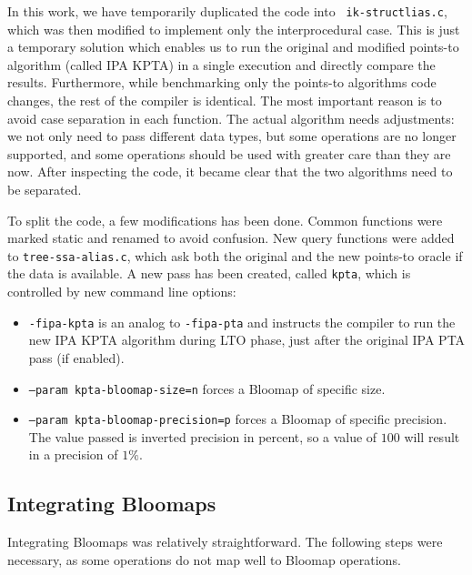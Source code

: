 In this work, we have temporarily duplicated the code into {\tt
ik-structlias.c}, which was then modified to implement only the interprocedural
case. This is just a temporary solution which enables us to run the original
and modified points-to algorithm (called IPA KPTA) in a single execution and directly compare the
results. Furthermore, while benchmarking only the points-to algorithms code
changes, the rest of the compiler is identical.  The most important reason is
to avoid case separation in each function. The actual algorithm needs
adjustments: we not only need to pass different data types, but some operations
are no longer supported, and some operations should be used with greater care
than they are now. After inspecting the code, it became clear that the two
algorithms need to be separated.

To split the code, a few modifications has been done. Common functions were
marked static and renamed to avoid confusion. New query functions were added to
{\tt tree-ssa-alias.c}, which ask both the original and the new points-to oracle
if the data is available. A new pass has been created, called {\tt kpta}, which
is controlled by new command line options:

\begin{itemize}
	\item {\tt -fipa-kpta} is an analog to {\tt -fipa-pta} and instructs the compiler to run the new IPA KPTA algorithm during LTO phase, just after the original IPA PTA pass (if enabled).
	\item {\tt --param kpta-bloomap-size=n} forces a Bloomap of specific size.
	\item {\tt --param kpta-bloomap-precision=p} forces a Bloomap of specific precision. The value passed is inverted precision in percent, so a value of $100$ will result in a precision of $1\%$.
\end{itemize}


\subsection{Integrating Bloomaps}

Integrating Bloomaps was relatively straightforward. The following steps were necessary, as some operations do not map well to Bloomap operations.

